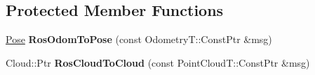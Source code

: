 \subsection*{Protected Member Functions}
\begin{DoxyCompactItemize}
\item 
\hypertarget{classdepth__clustering_1_1CloudOdomRosSubscriber_a2a5fac22f067b9cbfd395814c6939d8a}{\hyperlink{classdepth__clustering_1_1Pose}{Pose} {\bfseries Ros\-Odom\-To\-Pose} (const Odometry\-T\-::\-Const\-Ptr \&msg)}\label{classdepth__clustering_1_1CloudOdomRosSubscriber_a2a5fac22f067b9cbfd395814c6939d8a}

\item 
\hypertarget{classdepth__clustering_1_1CloudOdomRosSubscriber_ad80bb8e5ba1f5f21221233145337c5eb}{Cloud\-::\-Ptr {\bfseries Ros\-Cloud\-To\-Cloud} (const Point\-Cloud\-T\-::\-Const\-Ptr \&msg)}\label{classdepth__clustering_1_1CloudOdomRosSubscriber_ad80bb8e5ba1f5f21221233145337c5eb}

\end{DoxyCompactItemize}
